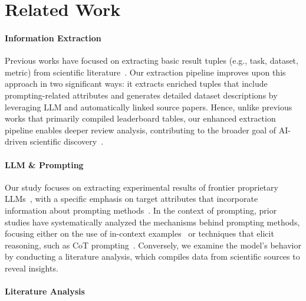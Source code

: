 \section{Related Work}

\paragraph{Information Extraction} Previous works have focused on extracting basic result tuples (e.g., task, dataset, metric) from scientific literature~\citep{singh2019automated, hou2019identification, kardas2020axcell, yang2022telin, bai2023schema, singh2024legobench, csahinucc2024efficient, kabongo2024orkg}. 
Our extraction pipeline improves upon this approach in two significant ways: it extracts enriched tuples that include prompting-related attributes and generates detailed dataset descriptions by leveraging LLM and automatically linked source papers.
Hence, unlike previous works that primarily compiled leaderboard tables, our enhanced extraction pipeline enables deeper review analysis, contributing to the broader goal of AI-driven scientific discovery~\citep{xu2021artificial, majumder2024discoverybench, m2024augmenting}.

\paragraph{LLM \& Prompting} Our study focuses on extracting experimental results of frontier proprietary LLMs~\citep{achiam2023gpt, anthropic@claude, team2023gemini}, with a specific emphasis on target attributes that incorporate information about prompting methods~\citep{brown2020language, wei2022chain, min2022rethinking}. 
In the context of prompting, prior studies have systematically analyzed the mechanisms behind prompting methods, focusing either on the use of in-context examples~\citep{min2022rethinking,lampinen2022can,weber2023mind, zhang2022robustness} or techniques that elicit reasoning, such as CoT prompting~\citep{wei2022chain, shaikh2023second, wang2023towards, turpin2024language, sprague2024cot, liu2024mind}.  
Conversely, we examine the model's behavior by conducting a literature analysis, which compiles data from scientific sources to reveal insights.


\paragraph{Literature Analysis}

